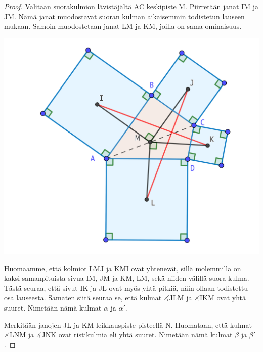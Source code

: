 \documentclass{scrartcl}
\begin{document}
\medskip
\begin{proof}
Valitaan suorakulmion lävistäjältä AC keskipiste M. Piirretään janat IM ja JM. Nämä janat muodostavat suoran kulman aikaisemmin todistetun lauseen mukaan. Samoin muodostetaan janat LM ja KM, joilla on sama ominaisuus.
\begin{center}
    \includegraphics[scale=0.25]{todistus1}
\end{center}
Huomaamme, että kolmiot LMJ ja KMI ovat yhtenevät, sillä molemmilla on kaksi samanpituista sivua IM, JM ja KM, LM, sekä niiden välillä suora kulma. Tästä seuraa, että sivut IK ja JL ovat myös yhtä pitkiä, näin ollaan todistettu osa lauseesta. Samaten siitä seuraa se, että kulmat $\measuredangle$JLM ja $\measuredangle$IKM ovat yhtä suuret. Nimetään nämä kulmat $\alpha$ ja $\alpha'$.

Merkitään janojen JL ja KM leikkauspiste pisteellä N. Huomataan, että kulmat $\measuredangle$LNM ja $\measuredangle$JNK ovat ristikulmia eli yhtä suuret. Nimetään nämä kulmat $\beta$ ja $\beta'$.


\end{proof}
\end{document}
